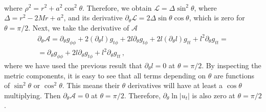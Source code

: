 \documentclass[referee]{aa}
\begin{document}
\begin{appendix}
\begin{eqnarray}
\end{eqnarray}
where $\rho^2 = r^2 + a^2\cos^2 \theta$. Therefore, we obtain $\mathcal{L} = \Delta \sin^2 \theta$, where $\Delta = r^2 - 2Mr + a^2$, and its derivative $\partial_{\theta}\mathcal{L} = 2 \Delta \sin \theta \cos \theta$, which is zero for $\theta = \pi/2$. Next, we take the derivative of $\mathcal{A}$
\begin{eqnarray}
\partial_{\theta} \mathcal{A} = \partial_{\theta} g_{\phi\phi} + 2 (\partial_{\theta} l) g_{t\phi} + 2l\partial_{\theta} g_{t\phi} + 2l(\partial_{\theta} l) g_{tt} + l^2 \partial_{\theta} g_{tt} = 
\nonumber \\
= \partial_{\theta} g_{\phi\phi} + 2l\partial_{\theta} g_{t\phi} + l^2 \partial_{\theta} g_{tt}\,,
\end{eqnarray}
where we have used the previous result that $\partial_{\theta} l=0$ at $\theta = \pi/2$. By inspecting the metric components, it is easy to see that all terms depending on $\theta$ are functions of $\sin^2 \theta$ or $\cos^2 \theta$. This means their $\theta$ derivatives will have at least a $\cos \theta$ multiplying. Then $\partial_{\theta} \mathcal{A} = 0$ at $\theta = \pi/2$. Therefore, $\partial_{\theta} \ln|u_t|$ is also zero at $\theta = \pi/2$.


\end{appendix}
\end{document}
